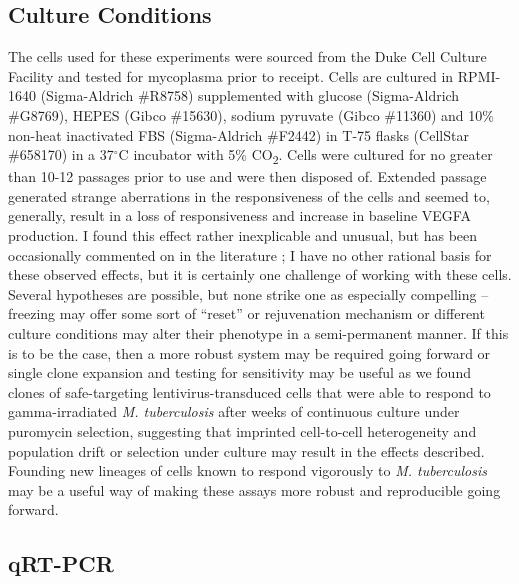 \subsection{Culture Conditions}\label{thp1culture}

The cells used for these experiments were sourced from the Duke Cell Culture Facility and tested for mycoplasma prior to receipt. Cells are cultured in RPMI\hyp{}1640 (Sigma\hyp{}Aldrich \#R8758) supplemented with glucose (Sigma\hyp{}Aldrich \#G8769), HEPES (Gibco \#15630), sodium pyruvate (Gibco \#11360) and 10\% non\hyp{}heat inactivated FBS (Sigma\hyp{}Aldrich \#F2442) in T\hyp{}75 flasks (CellStar \#658170) in a 37$^{\circ}$C incubator with 5\% CO\textsubscript{2}. Cells were cultured for no greater than 10\hyp{}12 passages prior to use and were then disposed of. Extended passage generated strange aberrations in the responsiveness of the cells and seemed to, generally, result in a loss of responsiveness and increase in baseline VEGFA production. I found this effect rather inexplicable and unusual, but has been occasionally commented on in the literature \citep{Stokes1999, An2009, Chanput2015, Lund2016, Gazova2020}; I have no other rational basis for these observed effects, but it is certainly one challenge of working with these cells. Several hypotheses are possible, but none strike one as especially compelling -- freezing may offer some sort of ``reset'' or rejuvenation mechanism or different culture conditions may alter their phenotype in a semi\hyp{}permanent manner. If this is to be the case, then a more robust system may be required going forward or single clone expansion and testing for sensitivity may be useful as we found clones of safe\hyp{}targeting lentivirus\hyp{}transduced cells that were able to respond to gamma\hyp{}irradiated \textit{M. tuberculosis} after weeks of continuous culture under puromycin selection, suggesting that imprinted cell\hyp{}to\hyp{}cell heterogeneity and population drift or selection under culture may result in the effects described. Founding new lineages of cells known to respond vigorously to \textit{M. tuberculosis} may be a useful way of making these assays more robust and reproducible going forward.

\subsection{qRT\hyp{}PCR}\label{qrtpcr}

